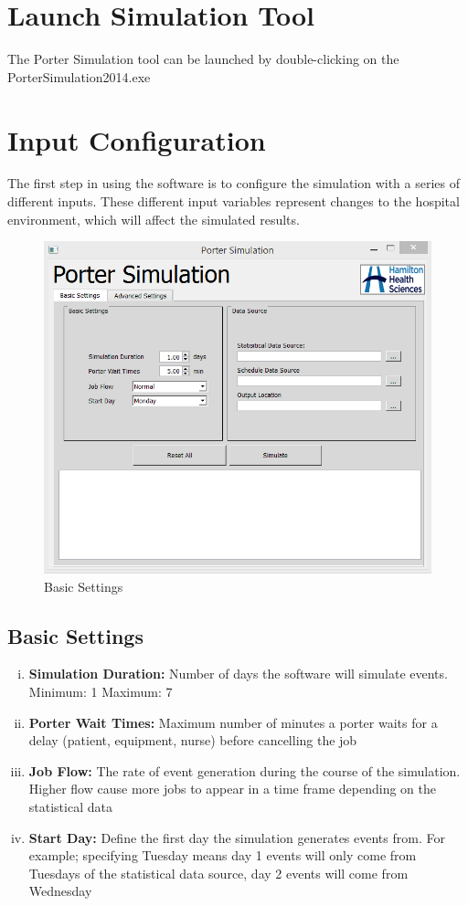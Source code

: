 \documentclass[paper=letter, fontsize=10pt]{scrartcl}
\numberwithin{equation}{section}		%
\numberwithin{figure}{section}			%
\numberwithin{table}{section}				%
\begin{document}
\section{Launch Simulation Tool}
The Porter Simulation tool can be launched by double-clicking on the PorterSimulation2014.exe

\section{Input Configuration}
The first step in using the software is to configure the simulation with a series of different inputs. These different input variables represent changes to the hospital environment, which will affect the simulated results.

	\begin{figure}[!htbp]
	\begin{center}
		\includegraphics[width=1\columnwidth, height=0.45\textheight, keepaspectratio]{BasicSettings.png}
		\caption{Basic Settings}
	\end{center}
	\end{figure} 
	\subsection{Basic Settings}
	\begin{enumerate}[(i)]
		\item \textbf{Simulation Duration:} Number of days the software will simulate events. Minimum: 1 Maximum: 7
		\item \textbf{Porter Wait Times:} Maximum number of minutes a porter waits for a delay (patient, equipment, nurse) before cancelling the job
		\item \textbf{Job Flow:} The rate of event generation during the course of the simulation. Higher flow cause more jobs to appear in a time frame depending on the statistical data
		\item \textbf{Start Day:} Define the first day the simulation generates events from. For example; specifying Tuesday means day 1 events will only come from Tuesdays of the statistical data source, day 2 events will come from Wednesday
	\end{enumerate}
	
\end{document}

